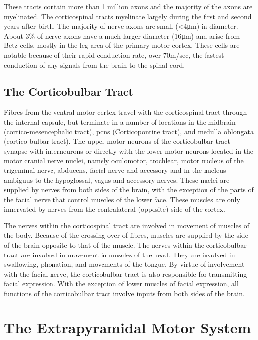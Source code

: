 These tracts contain more than 1 million axons and the majority of the axons are myelinated. The corticospinal tracts myelinate largely during the first and second years after birth. The majority of nerve axons are small (\textless{}4μm) in diameter. About 3\% of nerve axons have a much larger diameter (16μm) and arise from Betz cells, mostly in the leg area of the primary motor cortex. These cells are notable because of their rapid conduction rate, over 70m/sec, the fastest conduction of any signals from the brain to the spinal cord.

\hypertarget{the-corticobulbar-tract-1}{%
\subsection{The Corticobulbar Tract}\label{the-corticobulbar-tract-1}}

Fibres from the ventral motor cortex travel with the corticospinal tract through the internal capsule, but terminate in a number of locations in the midbrain (cortico-mesencephalic tract), pons (Corticopontine tract), and medulla oblongata (cortico-bulbar tract). The upper motor neurons of the corticobulbar tract synapse with interneurons or directly with the lower motor neurons located in the motor cranial nerve nuclei, namely oculomotor, trochlear, motor nucleus of the trigeminal nerve, abducens, facial nerve and accessory and in the nucleus ambiguus to the hypoglossal, vagus and accessory nerves. These nuclei are supplied by nerves from both sides of the brain, with the exception of the parts of the facial nerve that control muscles of the lower face. These muscles are only innervated by nerves from the contralateral (opposite) side of the cortex.

The nerves within the corticospinal tract are involved in movement of muscles of the body. Because of the crossing-over of fibres, muscles are supplied by the side of the brain opposite to that of the muscle. The nerves within the corticobulbar tract are involved in movement in muscles of the head. They are involved in swallowing, phonation, and movements of the tongue. By virtue of involvement with the facial nerve, the corticobulbar tract is also responsible for transmitting facial expression. With the exception of lower muscles of facial expression, all functions of the corticobulbar tract involve inputs from both sides of the brain.

\hypertarget{the-extrapyramidal-motor-system}{%
\section{The Extrapyramidal Motor System}\label{the-extrapyramidal-motor-system}}

